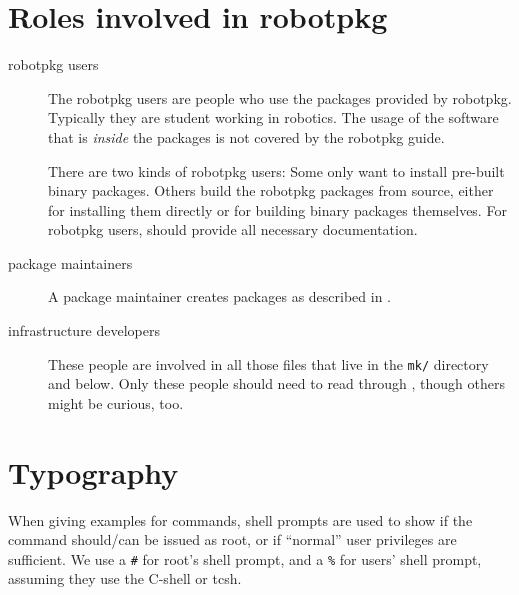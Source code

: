 \section{Roles involved in robotpkg} %

\begin{description}
   \item[robotpkg users] The  robotpkg users  are people  who  use the packages
   provided by robotpkg.  Typically they are student  working  in robotics. The
   usage  of the software  that is {\em inside} the  packages is not covered by
   the robotpkg guide.

   There are two  kinds of robotpkg users:  Some only want to install pre-built
   binary packages.  Others build the robotpkg packages from source, either for
   installing them  directly or for building binary   packages themselves.  For
   robotpkg users,   should provide
   all necessary documentation.

   \item[package  maintainers]   A   package maintainer  creates  packages   as
   described in .

   \item[infrastructure  developers]  These people are    involved in all those
   files that live  in the {\tt mk/} directory   and below.  Only  these people
   should             need          to               read               through
   , though others might be
   curious, too.

\end{description}


\section{Typography} %

When giving examples for  commands,  shell prompts  are  used  to show if   the
command  should/can be issued  as  root, or if  ``normal''  user privileges are
sufficient. We use  a {\tt \#}  for  root's shell  prompt, and  a {\tt \%}  for
users' shell prompt, assuming they use the C-shell or tcsh.

